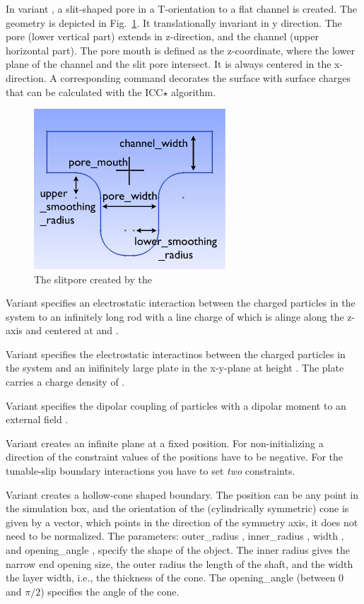In variant , a slit-shaped pore in a T-orientation to a flat channel
is created. 
The geometry is depicted in Fig.~\ref{fig:slitpore}.
It translationally invariant in y direction.
The pore (lower vertical part) extends in z-direction, and the channel (upper
horizontal part). The pore mouth is defined as the z-coordinate, where the lower
plane of the channel and the slit pore intersect. It is always centered in the
x-direction. A corresponding  command decorates the surface
with surface charges that can be calculated with the ICC$\star$ algorithm.
\begin{figure}[ht]
  \label{fig:slitpore}
  \begin{center}
  \includegraphics[height=6cm]{figures/slitpore.pdf}
  \caption{The slitpore created by the }
  \end{center}
\end{figure}

Variant  specifies an electrostatic interaction between the
charged particles in the system to an infinitely long rod with a line
charge of  which is alinge along the z-axis and centered
at  and .

Variant  specifies the electrostatic interactinos between
the charged particles in the system and an inifinitely large plate in
the x-y-plane at height . The plate carries a charge density of
.
  
Variant  specifies the dipolar coupling of particles with a
dipolar moment to an external field   .

Variant  creates an infinite plane at a fixed position. For
non-initializing a direction of the constraint values of the positions
have to be negative. For the tunable-slip boundary interactions you
have to set \emph{two} constraints.

Variant  creates a hollow-cone shaped boundary. The position can be any point in the simulation
box, and the orientation of the (cylindrically symmetric) cone is
given by a vector, which points in the direction of the symmetry axis, it
does not need to be normalized. The parameters: outer_radius ,
inner_radius , width , and opening_angle , specify the shape of the object. The inner radius gives the narrow end opening size, the outer radius the length of the shaft, and the width the layer width, i.e., the thickness of the cone. The opening_angle (between 0 and $\pi/2$) specifies the angle of the cone. 

